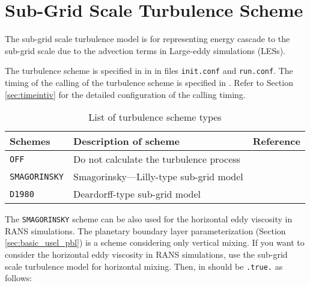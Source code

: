 
\section{Sub-Grid Scale Turbulence Scheme} \label{sec:basic_usel_turbulence}

The sub-grid scale turbulence model is for representing energy cascade to the sub-grid scale due to the advection terms in Large-eddy simulations (LESs).


The turbulence scheme is specified in  in  in files \verb|init.conf| and \verb|run.conf|. The timing of the calling of the turbulence scheme is specified in . Refer to Section \ref{sec:timeintiv} for the detailed configuration of the calling timing.

\begin{table}[h]
\begin{center}
  \caption{List of turbulence scheme types}
  \label{tab:nml_atm_tb}
  \begin{tabularx}{150mm}{lXX} \hline
    \rowcolor[gray]{0.9}  Schemes & Description of scheme & Reference\\ \hline
      \verb|OFF|          & Do not calculate the turbulence process &  \\
      \verb|SMAGORINSKY|  & Smagorinsky—Lilly-type sub-grid model & \citet{smagorinsky_1963,lilly_1962,Brown_etal_1994,Scotti_1993} \\
      \verb|D1980|        & Deardorff-type sub-grid model & \citet{Deardorff_1980} \\
    \hline
  \end{tabularx}
\end{center}
\end{table}

The \verb|SMAGORINSKY| scheme can be also used for the horizontal eddy viscosity in RANS simulations.
The planetary boundary layer parameterization (Section \ref{sec:basic_usel_pbl}) is a scheme considering only vertical mixing.
If you want to consider the horizontal eddy viscosity in RANS simulations,
use the sub-grid scale turbulence model for horizontal mixing.
Then,  in  should be \verb|.true.| as follows:
